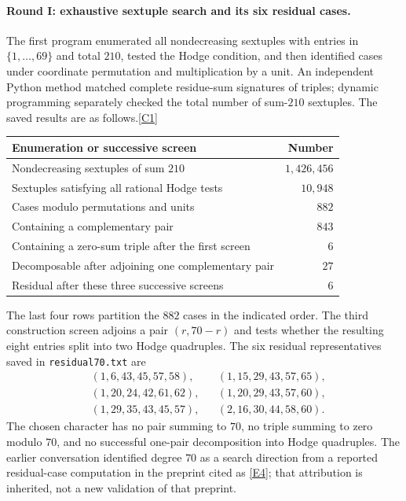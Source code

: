 \documentclass[11pt]{article}
\newcommand{\src}[1]{\hyperlink{src:#1}{[#1]}}
\begin{document}
\paragraph{Round I: exhaustive sextuple search and its six residual cases.}
The first program enumerated all nondecreasing sextuples with entries in
$\{1,\ldots,69\}$ and total $210$, tested the Hodge condition, and then
identified cases under coordinate permutation and multiplication by a unit.
An independent Python method matched complete residue-sum signatures of
triples; dynamic programming separately checked the total number of
sum-$210$ sextuples. The saved results are as follows.\src{C1}
\begin{center}
\begin{tabular}{lr}
\toprule
Enumeration or successive screen & Number\\
\midrule
Nondecreasing sextuples of sum $210$ & $1,426,456$\\
Sextuples satisfying all rational Hodge tests & $10,948$\\
Cases modulo permutations and units & $882$\\
Containing a complementary pair & $843$\\
Containing a zero-sum triple after the first screen & $6$\\
Decomposable after adjoining one complementary pair & $27$\\
Residual after these three successive screens & $6$\\
\bottomrule
\end{tabular}
\end{center}
The last four rows partition the $882$ cases in the indicated order. The
third construction screen adjoins a pair $(r,70-r)$ and tests whether the
resulting eight entries split into two Hodge quadruples. The six residual
representatives saved in \texttt{residual70.txt} are
\begin{align*}
 &(1,6,43,45,57,58), &&(1,15,29,43,57,65),\\
 &(1,20,24,42,61,62),&&(1,20,29,43,57,60),\\
 &(1,29,35,43,45,57),&&(2,16,30,44,58,60).
\end{align*}
The chosen character has no pair summing to $70$, no triple summing to zero
modulo $70$, and no successful one-pair decomposition into Hodge quadruples.
The earlier conversation identified degree $70$ as a search direction from a
reported residual-case computation in the preprint cited as \src{E4}; that
attribution is inherited, not a new validation of that preprint.
\end{document}
